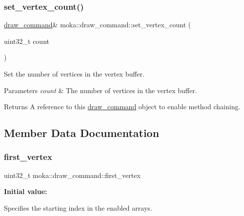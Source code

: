\subsubsection{\texorpdfstring{set\_vertex\_count()}{set\_vertex\_count()}}
{\footnotesize\ttfamily \mbox{\hyperlink{classmoka_1_1draw__command}{draw\+\_\+command}}\& moka\+::draw\+\_\+command\+::set\+\_\+vertex\+\_\+count (\begin{DoxyParamCaption}\item[{uint32\+\_\+t}]{count }\end{DoxyParamCaption})}



Set the number of vertices in the vertex buffer. 


\begin{DoxyParams}{Parameters}
{\em count} & The number of vertices in the vertex buffer. \\
\hline
\end{DoxyParams}
\begin{DoxyReturn}{Returns}
A reference to this \mbox{\hyperlink{classmoka_1_1draw__command}{draw\+\_\+command}} object to enable method chaining. 
\end{DoxyReturn}


\subsection{Member Data Documentation}
\mbox{\label{classmoka_1_1draw__command_a9e5374f3b03168ea8dd28a3d6a08d41a}} 
\subsubsection{\texorpdfstring{first\_vertex}{first\_vertex}}
{\footnotesize\ttfamily uint32\+\_\+t moka\+::draw\+\_\+command\+::first\+\_\+vertex}

{\bfseries Initial value\+:}
\begin{DoxyCode}{0}
\DoxyCodeLine{=}

\end{DoxyCode}
Specifies the starting index in the enabled arrays. \mbox{\label{classmoka_1_1draw__command_a39fa2598343c32a5894fd8e3ed79c21f}} 
